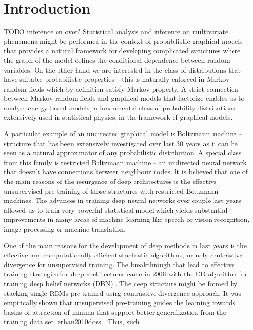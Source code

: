 \chapter*{Introduction}
TODO inference on over?
Statistical analysis and inference on multivariate phenomena might be performed in the context of probabilistic graphical models that provides a natural framework for developing complicated structures where the graph of the model defines the conditional dependence between random variables. On the other hand we are interested in the class of distributions that have suitable probabilistic properties -- this is naturally enforced in Markov random fields which by definition satisfy Markov property. A strict connection between Markov random fields and graphical models that factorize enables us to analyse energy based models, a fundamental class of probability distributions extensively used in statistical physics, in the framework of graphical models.

A particular example of an undirected graphical model is Boltzmann machine -- structure that has been extensively investigated over last $30$ years as it can be seen as a natural approximator of any probabilistic distribution. A special class from this family is restricted Boltzmann machine -- an undirected neural network that doesn't have connections between neighbour nodes. It is believed that one of the main reasons of the resurgence of deep architectures is the effective unsupervised pre-training of those structures with restricted Boltzmann machines. The advances in training deep neural networks over couple last years allowed us to train very powerful statistical model which yields substantial improvements in many areas of machine learning like speech or vision recognition, image processing or machine translation. 

One of the main reasons for the development of deep methods in last years is the effective and computationally efficient stochastic algorithms, namely contrastive divergence for unsupervised training. The breakthrough that lead to effective training strategies for deep architectures came in 2006 with the CD algorithm for training deep belief networks (DBN) \cite{hinton2006reducing}. The deep structure might be formed by stacking single RBMs pre-trained using contrastive divergence approach. It was empirically shown that unsupervised pre-training guides the learning towards basins of attraction of minima that support better generalization from the training data set \ref{erhan2010does}. Thus, such 

